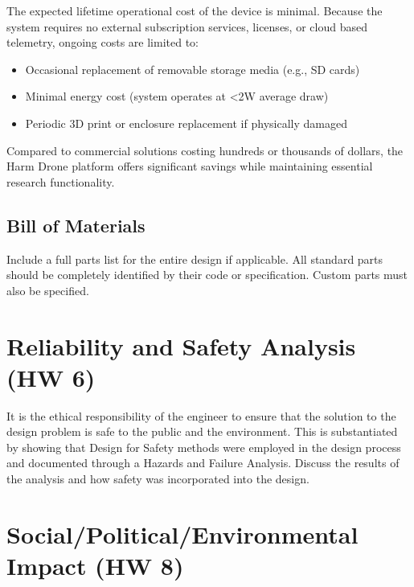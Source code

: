 \documentclass[12pt]{article}
\begin{document}
\par The expected lifetime operational cost of the device is minimal. Because the system requires no external subscription services, licenses, or cloud based telemetry, ongoing costs are limited to:

\begin{itemize}
\item Occasional replacement of removable storage media (e.g., SD cards)
\item Minimal energy cost (system operates at \textless 2W average draw)
\item Periodic 3D print or enclosure replacement if physically damaged
\end{itemize}

\par Compared to commercial solutions costing hundreds or thousands of dollars, the Harm Drone platform offers significant savings while maintaining essential research functionality.

\subsection{Bill of Materials}
Include a full parts list for the entire design if applicable. All standard parts should be completely identified by their code or specification. Custom parts must also be specified.
\section{Reliability and Safety Analysis (HW 6)}
It is the ethical responsibility of the engineer to ensure that the solution to the design problem is safe to the public and the environment. This is substantiated by showing that Design for Safety methods were employed in the design process and documented through a Hazards and Failure Analysis. Discuss the results of the analysis and how safety was incorporated into the design.

\section{Social/Political/Environmental Impact (HW 8)}
\end{document}
